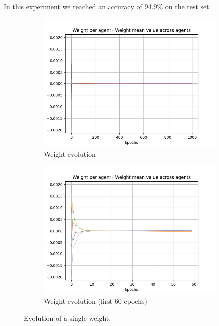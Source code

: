 \documentclass[a4paper,11pt,oneside]{book}
\begin{document}
\bigskip
In this experiment we reached an accuracy of $94.9\%$ on the test set.

\begin{figure}[h]
\centering
	\begin{subfigure}{0.49\textwidth}	
	\includegraphics[width=\textwidth]{figs/test1/Single_weight.png}
	\caption{Weight evolution}
	\end{subfigure}
\hfill
	\begin{subfigure}{0.49\textwidth}	
	\includegraphics[width=\textwidth]{figs/test1/Single_weight-60.png}
	\caption{Weight evolution (first 60 epochs)}
	\end{subfigure}
\caption{Evolution of a single weight.}
\label{test1_var}
\end{figure}
\end{document}
